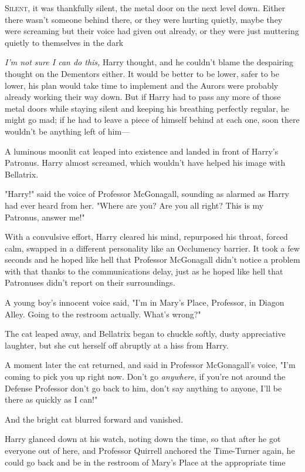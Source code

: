 
\lettrine{S}{ilent}, it was
thankfully silent, the metal door on the next level down. Either there wasn't
someone behind there, or they were hurting quietly, maybe they were screaming
but their voice had given out already, or they were just muttering quietly to
themselves in the dark{\el}

\emph{I'm not sure I can do this,} Harry thought, and he couldn't blame the
despairing thought on the Dementors either. It would be better to be lower,
safer to be lower, his plan would take time to implement and the Aurors were
probably already working their way down. But if Harry had to pass any more of
those metal doors while staying silent and keeping his breathing perfectly
regular, he might go mad; if he had to leave a piece of himself behind at each
one, soon there wouldn't be anything left of him—

A luminous moonlit cat leaped into existence and landed in front of Harry's
Patronus. Harry almost screamed, which wouldn't have helped his image with
Bellatrix.

"Harry!" said the voice of Professor McGonagall, sounding as alarmed as Harry
had ever heard from her. "Where are you? Are you all right? This is my
Patronus, answer me!"

With a convulsive effort, Harry cleared his mind, repurposed his throat, forced
calm, swapped in a different personality like an Occlumency barrier. It took a
few seconds and he hoped like hell that Professor McGonagall didn't notice a
problem with that thanks to the communications delay, just as he hoped like
hell that Patronuses didn't report on their surroundings.

A young boy's innocent voice said, "I'm in Mary's Place, Professor, in Diagon
Alley. Going to the restroom actually. What's wrong?"

The cat leaped away, and Bellatrix began to chuckle softly, dusty appreciative
laughter, but she cut herself off abruptly at a hiss from Harry.

A moment later the cat returned, and said in Professor McGonagall's voice, "I'm
coming to pick you up right now. Don't go \emph{anywhere}, if you're not around
the Defense Professor don't go back to him, don't say anything to anyone, I'll
be there as quickly as I can!"

And the bright cat blurred forward and vanished.

Harry glanced down at his watch, noting down the time, so that after he got
everyone out of here, and Professor Quirrell anchored the Time-Turner again, he
could go back and be in the restroom of Mary's Place at the appropriate
time{\el}

